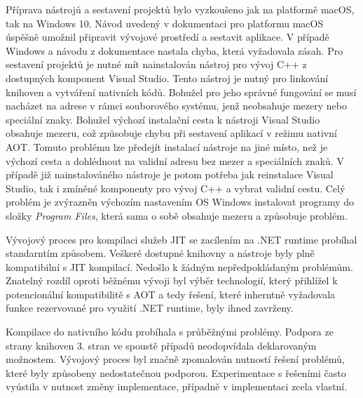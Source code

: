 

Příprava nástrojů a sestavení projektů bylo vyzkoušeno jak na platformě macOS, tak na Windows 10. Návod uvedený v dokumentaci pro platformu macOS úspěšně umožnil připravit vývojové prostředí a sestavit aplikace. V případě Windows a návodu z dokumentace nastala chyba, která vyžadovala zásah. Pro sestavení projektů je nutné mít nainstalován nástroj pro vývoj C++ z dostupných komponent Visual Studio. Tento nástroj je nutný pro linkování knihoven a vytváření nativních kódů. Bohužel pro jeho správné fungování se musí nacházet na adrese v rámci souborového systému, jenž neobsahuje mezery nebo speciální znaky. Bohužel výchozí instalační cesta k nástroji Visual Studio obsahuje mezeru, což způsobuje chybu při sestavení aplikací v režimu nativní AOT. Tomuto problému lze předejít instalací nástroje na jiné místo, než je výchozí cesta a dohlédnout na validní adresu bez mezer a speciálních znaků. V případě již nainstalováného nástroje je potom potřeba jak reinstalace Visual Studio, tak i zmíněné komponenty pro vývoj C++ a vybrat validní cestu. Celý problém je zvýrazněn výchozím nastavením OS Windows instalovat programy do složky \emph{Program Files}, která sama o sobě obsahuje mezeru a způsobuje problém.


Vývojový proces pro kompilaci služeb JIT se zacílením na .NET runtime probíhal standarntím způsobem. Veškeré dostupné knihovny a nástroje byly plně kompatibilní s JIT kompilací. Nedošlo k žádným nepředpokládaným problémům. Znatelný rozdíl oproti běžnému vývoji byl výběr technologií, který přihlížel k potencionální kompatibilitě s AOT a tedy řešení, které inherntně vyžadovala funkce rezervované pro využití .NET runtime, byly ihned zavrženy.


Kompilace do nativního kódu probíhala s průběžnými problémy. Podpora ze strany knihoven 3. stran ve spoustě případů neodopvídala deklarovaným možnostem. Vývojový proces byl značně zpomalován nutností řešení problémů, které byly způsobeny nedostatečnou podporou. Experimentace s řešeními často vyústila v nutnost změny implementace, případně v implementaci zcela vlastní.

